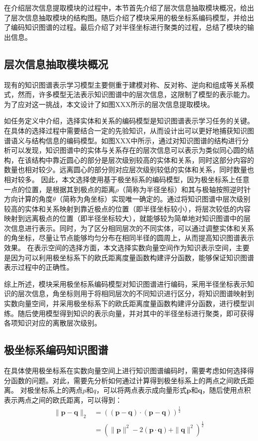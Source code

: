 \documentclass[algorithmlist, AutoFakeBold, AutoFakeSlant, figurelist, tablelist, nomlist, masters]{seuthesix}
\begin{document}
在介绍层次信息提取模块的过程中，本节首先介绍了层次信息抽取模块概况，给出了层次信息抽取模块的结构图。随后介绍了模块采用的极坐标系编码模型，并给出了编码知识图谱的过程。最后介绍了对半径坐标进行聚类的过程，总结了模块的输出信息。

\subsection{层次信息抽取模块概况}
现有的知识图谱表示学习模型主要侧重于建模对称、反对称、逆向和组成等关系模式，然而，许多模型无法表示知识图谱中的层次信息，这限制了模型的表示能力。为了应对这一挑战，本文设计了如图XXX所示的层次信息提取模块。

如任务定义中介绍，选择实体和关系的编码模型是知识图谱表示学习任务的关键。在具体的选择过程中需要结合一定的先验知识，从而设计出可以更好地捕获知识图谱语义与结构信息的编码模型。如图XXX中所示，通过对知识图谱的结构进行分析可以发现，知识图谱中的实体与关系存在的层次信息可以表示为类似同心圆的结构，在该结构中靠近圆心的部分是层次级别较高的实体和关系，同时这部分内容的数量也相对较少。远离圆心的部分则对应层次级别较低的实体和关系，同时数量也相对较多。
因此，本文选择使用基于极坐标系的编码模型，因为极坐标系上任意一点的位置，是根据其到极点的距离$\rho$（简称为半径坐标）和其与极轴按照逆时针方向计算的角度$\theta$（简称为角坐标）实现唯一确定的。通过将知识图谱中层次级别较高的实体和关系映射到靠近极点的位置（即半径坐标较小），将层次较低的内容映射到远离极点的位置（即半径坐标较大），就能够较为简单地对知识图谱中的层次信息进行表示。同时，为了区分相同层次的不同实体，可以通过调整实体和关系的角坐标，尽量让节点能够均匀分布在相同半径的圆周上，从而提高知识图谱表示效果。
在表示空间的选择方面，本文选择实数向量空间作为知识表示空间，主要是因为可以利用极坐标系下的欧氏距离度量函数构建评分函数，能够保证知识图谱表示过程中的正确性。

综上所述，模块采用极坐标系编码模型对知识图谱进行编码，采用半径坐标表示知识的层次信息，角坐标则用于将相同层次的不同知识进行区分，将知识图谱映射到实数向量空间，并采用极坐标系下的欧氏距离度量函数构建评分函数，进行模型训练。随后使用模型得到知识的表示向量，并对其中的半径坐标进行聚类，即可获得各项知识对应的离散层次级别。

\subsection{极坐标系编码知识图谱}
在具体使用极坐标系在实数向量空间上进行知识图谱编码时，需要考虑如何选择得分函数的问题。对此，需要先分析如何通过计算得到极坐标系上的两点之间欧氏距离。
对极坐标系上的两点$p$和$q$，可以将两点表示成向量形式$\bm{p}$和$\bm{q}$，随后使用点积表示两点之间的欧氏距离，可以得到：
\begin{equation}
  \begin{aligned}
  \|\bm{p}-\bm{q}\|_2 & =\left((\bm{p}-\bm{q}) \cdot(\bm{p}-\bm{q})\right)^{\frac{1}{2}} \\
  & =\left(\|\bm{p}\|^2-2(\bm{p} \cdot \bm{q})+\|\bm{q}\|^2\right)^{\frac{1}{2}}
  \end{aligned}
\end{equation}
\end{document}
